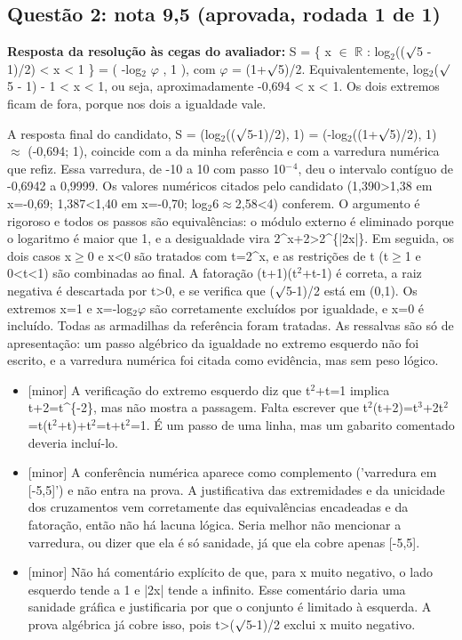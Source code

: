 \documentclass{article}%
\begin{document}
\subsection*{Questão 2: nota 9,5 (aprovada, rodada 1 de 1)}%
\textbf{Resposta da resolução às cegas do avaliador:} S = \{ x $\in$ $\mathbb{R}$ : log$_{2}$(($\surd$5 - 1)/2) < x < 1 \} = ( -log$_{2}$ $\varphi$ , 1 ), com $\varphi$ = (1+$\surd$5)/2. Equivalentemente, log$_{2}$($\surd$5 - 1) - 1 < x < 1, ou seja, aproximadamente -0,694 < x < 1. Os dois extremos ficam de fora, porque nos dois a igualdade vale.\par %
A resposta final do candidato, S = (log$_{2}$(($\surd$5-1)/2), 1) = (-log$_{2}$((1+$\surd$5)/2), 1) $\approx$ (-0,694; 1), coincide com a da minha referência e com a varredura numérica que refiz. Essa varredura, de -10 a 10 com passo 10$^{-}$$^{4}$, deu o intervalo contíguo de -0,6942 a 0,9999. Os valores numéricos citados pelo candidato (1,390>1,38 em x=-0,69; 1,387<1,40 em x=-0,70; log$_{2}$6$\approx$2,58<4) conferem. O argumento é rigoroso e todos os passos são equivalências: o módulo externo é eliminado porque o logaritmo é maior que 1, e a desigualdade vira 2\^{}x+2>2\^{}\{|2x|\}. Em seguida, os dois casos x$\geq$0 e x<0 são tratados com t=2\^{}x, e as restrições de t (t$\geq$1 e 0<t<1) são combinadas ao final. A fatoração (t+1)(t$^2$+t-1) é correta, a raiz negativa é descartada por t>0, e se verifica que ($\surd$5-1)/2 está em (0,1). Os extremos x=1 e x=-log$_{2}$$\varphi$ são corretamente excluídos por igualdade, e x=0 é incluído. Todas as armadilhas da referência foram tratadas. As ressalvas são só de apresentação: um passo algébrico da igualdade no extremo esquerdo não foi escrito, e a varredura numérica foi citada como evidência, mas sem peso lógico.%
\begin{itemize}%
\item%
{[}minor{]} A verificação do extremo esquerdo diz que t$^2$+t=1 implica t+2=t\^{}\{{-}2\}, mas não mostra a passagem. Falta escrever que t$^2$(t+2)=t$^3$+2t$^2$=t(t$^2$+t)+t$^2$=t+t$^2$=1. É um passo de uma linha, mas um gabarito comentado deveria incluí{-}lo.%
\item%
{[}minor{]} A conferência numérica aparece como complemento ('varredura em {[}{-}5,5{]}') e não entra na prova. A justificativa das extremidades e da unicidade dos cruzamentos vem corretamente das equivalências encadeadas e da fatoração, então não há lacuna lógica. Seria melhor não mencionar a varredura, ou dizer que ela é só sanidade, já que ela cobre apenas {[}{-}5,5{]}.%
\item%
{[}minor{]} Não há comentário explícito de que, para x muito negativo, o lado esquerdo tende a 1 e |2x| tende a infinito. Esse comentário daria uma sanidade gráfica e justificaria por que o conjunto é limitado à esquerda. A prova algébrica já cobre isso, pois t>($\surd$5-1)/2 exclui x muito negativo.%
\end{itemize}%
\end{document}
